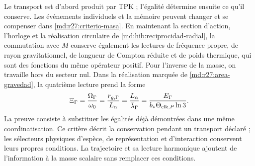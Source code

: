 Le transport est d'abord produit par TPK ; l'égalité détermine ensuite ce qu'il conserve. Les événements individuels et la mémoire peuvent changer et se compenser dans \eqref{md:r27:criterio-masa}. En maintenant la section d'action, l'horloge et la réalisation circulaire de \eqref{md:hib:reciprocidad-radial}, la commutation avec $M$ conserve également les lectures de fréquence propre, de rayon gravitationnel, de longueur de Compton réduite et de poids thermique, qui sont des fonctions du même opérateur positif. Pour l'inverse de la masse, on travaille hors du secteur nul. Dans la réalisation marquée de \eqref{md:r27:area-gravedad}, la quatrième lecture prend la forme
\begin{equation}
 \Xi_\Gamma=\frac{\Omega_\Gamma}{\omega_0}
 =\frac{r_{g,\Gamma}}{L_\alpha}
 =\frac{L_\alpha}{\bar\lambda_\Gamma}
 =\frac{E_\Gamma}{b_*\Theta_{{\rm clk},P}\ln3}.
 \label{md:r27:lecturas-conservadas}
\end{equation}
La preuve consiste à substituer les égalités déjà démontrées dans une même coordinatisation. Ce critère décrit la conservation pendant un transport déclaré ; les sélecteurs physiques d'espèce, de représentation et d'interaction conservent leurs propres conditions. La trajectoire et sa lecture harmonique ajoutent de l'information à la masse scalaire sans remplacer ces conditions.
